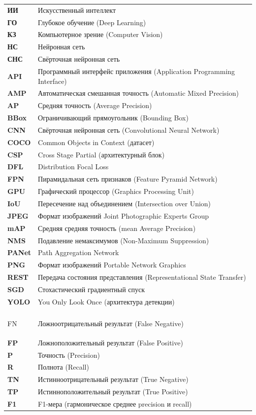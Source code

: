 \begin{longtable}{>{\bfseries}p{3.2cm} p{10.8cm}}
ИИ     & Искусственный интеллект \\
ГО     & Глубокое обучение (Deep Learning) \\
КЗ     & Компьютерное зрение (Computer Vision) \\
НС     & Нейронная сеть \\
СНС    & Свёрточная нейронная сеть \\
API    & Программный интерфейс приложения (Application Programming Interface) \\
AMP    & Автоматическая смешанная точность (Automatic Mixed Precision) \\
AP     & Средняя точность (Average Precision) \\
BBox   & Ограничивающий прямоугольник (Bounding Box) \\
CNN    & Свёрточная нейронная сеть (Convolutional Neural Network) \\
COCO   & Common Objects in Context (датасет) \\
CSP    & Cross Stage Partial (архитектурный блок) \\
DFL    & Distribution Focal Loss \\
FPN    & Пирамидальная сеть признаков (Feature Pyramid Network) \\
GPU    & Графический процессор (Graphics Processing Unit) \\
IoU    & Пересечение над объединением (Intersection over Union) \\
JPEG   & Формат изображений Joint Photographic Experts Group \\
mAP    & Средняя средняя точность (mean Average Precision) \\
NMS    & Подавление немаксимумов (Non-Maximum Suppression) \\
PANet  & Path Aggregation Network \\
PNG    & Формат изображений Portable Network Graphics \\
REST   & Передача состояния представления (Representational State Transfer) \\
SGD    & Стохастический градиентный спуск \\
YOLO   & You Only Look Once (архитектура детекции) \\

\addlinespace[0.5em]
\multicolumn{2}{l}{\textit{Метрики и оценка}} \\
\addlinespace[0.2em]

FN     & Ложноотрицательный результат (False Negative) \\
FP     & Ложноположительный результат (False Positive) \\
P      & Точность (Precision) \\
R      & Полнота (Recall) \\
TN     & Истинноотрицательный результат (True Negative) \\
TP     & Истинноположительный результат (True Positive) \\
F1     & F1-мера (гармоническое среднее precision и recall) \\


\end{longtable}
